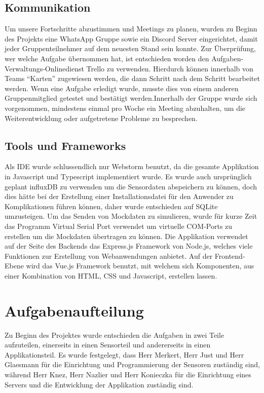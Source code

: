 \documentclass[]{article}
\begin{document}
	\subsection{Kommunikation}
	Um unsere Fortschritte abzustimmen und Meetings zu planen, wurden zu Beginn des Projekts eine WhatsApp Gruppe sowie ein Discord Server eingerichtet, damit jeder Gruppenteilnehmer auf dem neuesten Stand sein konnte. Zur Überprüfung, wer welche Aufgabe übernommen hat, ist entschieden worden den Aufgaben-Verwaltungs-Onlinedienst Trello zu verwenden. Hierdurch können innerhalb von Teams “Karten” zugewiesen werden, die dann Schritt nach dem Schritt bearbeitet werden. Wenn eine Aufgabe erledigt wurde, musste dies von einem anderen Gruppenmitglied getestet und bestätigt werden.\newline Innerhalb der Gruppe wurde sich vorgenommen, mindestens einmal pro Woche ein Meeting abzuhalten, um die Weiterentwicklung oder aufgetretene Probleme zu besprechen.
	
	\subsection{Tools und Frameworks}
	Als IDE wurde schlussendlich nur Webstorm benutzt, da die gesamte Applikation in Javascript und Typescript implementiert wurde. Es wurde auch ursprünglich geplant influxDB zu verwenden um die Sensordaten abspeichern zu können, doch dies hätte bei der Erstellung einer Installationsdatei für den Anwender zu Komplikationen führen können, daher wurde entschieden auf SQLite umzusteigen. Um das Senden von Mockdaten zu simulieren, wurde für kurze Zeit das Programm Virtual Serial Port verwendet um virtuelle COM-Ports zu erstellen um die Mockdaten übertragen zu können.\newline
	Die Applikation verwendet auf der Seite des Backends das Express.js Framework von Node.js, welches viele Funktionen zur Erstellung von Webanwendungen anbietet. Auf der Frontend-Ebene wird das Vue.js Framework benutzt, mit welchem sich Komponenten, aus einer Kombination von HTML, CSS und Javascript, erstellen lassen. 
	
	
	\section{Aufgabenaufteilung} %
	Zu Beginn des Projektes wurde entschieden die Aufgaben in zwei Teile aufzuteilen, einerseits in einen Sensorteil und andererseits in einen Applikationsteil. Es wurde festgelegt, dass Herr Merkert, Herr Just und Herr Glaesmann für die Einrichtung und Programmierung der Sensoren zuständig sind, während Herr Knez, Herr Nazlier und Herr Konieczka für die Einrichtung eines Servers und die Entwicklung der Applikation zuständig sind. 
\end{document}
